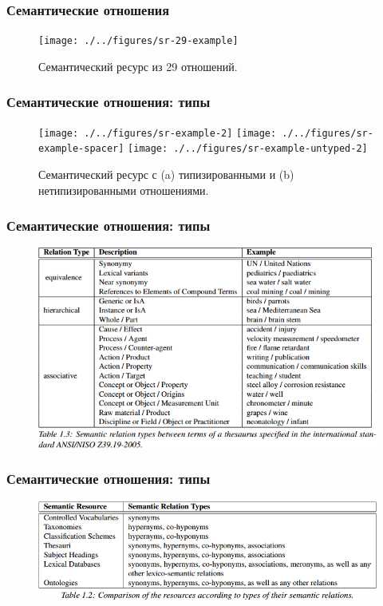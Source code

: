 \begin{frame}
\frametitle{Семантические отношения}
\begin{figure}
\centering
\texttt{[image: ./../figures/sr-29-example]}
\caption{Семантический ресурс из 29 отношений.}
\end{figure}

\end{frame}






\begin{frame}
\frametitle{Семантические отношения: типы}

\begin{figure}
\centering
\texttt{[image: ./../figures/sr-example-2]}
\texttt{[image: ./../figures/sr-example-spacer]}
\texttt{[image: ./../figures/sr-example-untyped-2]}
\caption{Семантический ресурс с (a) типизированными  и (b) нетипизированными  отношениями. }
\end{figure}

\end{frame}






\begin{frame}
\frametitle{Семантические отношения: типы}

\begin{figure}
\centering
\includegraphics[height=0.49\textwidth]{./figures/sem-types}
\end{figure}

\end{frame}






\begin{frame}
\frametitle{Семантические отношения: типы}
\begin{figure}
\includegraphics[width=1.0\textwidth]{figures/sem-res-table}
\end{figure}
\end{frame}


